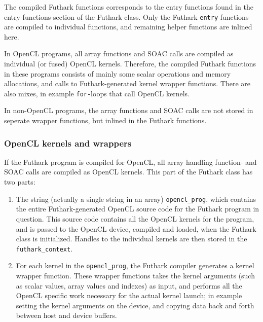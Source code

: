   The compiled Futhark functions corresponds to the entry functions found
  in the entry functions-section of the Futhark class.
  Only the Futhark \texttt{entry} functions are compiled to individual functions, and
  remaining helper functions are inlined here.

  In OpenCL programs, all array functions and SOAC calls are compiled as
  individual (or fused) OpenCL kernels. Therefore, the compiled Futhark
  functions in these programs consists of mainly some scalar operations and
  memory allocations, and calls to Futhark-generated kernel wrapper functions.
  There are also mixes, in example \texttt{for-}loops that call OpenCL kernels.
  
  In non-OpenCL programs, the array functions and SOAC calls are not stored in
  seperate wrapper functions, but inlined in the Futhark functions.

\subsubsection{OpenCL kernels and wrappers}
  If the Futhark program is compiled for OpenCL, all array handling function- and
  SOAC calls are compiled as OpenCL kernels. This part of the Futhark class
  has two parts:
  \begin{enumerate}
  \item The string (actually a single string in an array) \texttt{opencl\_prog}, which contains the entire
  Futhark-generated OpenCL source code for the Futhark program in question.
  This source code contains all the OpenCL kernels for the program, and is
  passed to the OpenCL device, compiled and loaded, when the Futhark class is
  initialized. Handles to the individual kernels are then stored in the \texttt{futhark\_context}.

  \item For each kernel in the \texttt{opencl\_prog}, the Futhark compiler
    generates a kernel wrapper function. These wrapper functions takes the
    kernel arguments (such as scalar values, array values and indexes) as input,
    and performs all the OpenCL specific work necessary for the actual kernel
    launch; in example setting the kernel arguments on the device, and copying
    data back and forth between host and device buffers.
  \end{enumerate}

